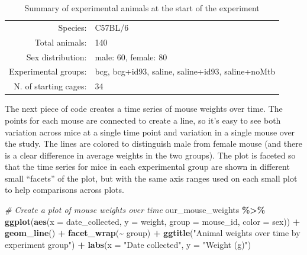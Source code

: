 \documentclass[
]{book}
\newenvironment{Shaded}{\begin{snugshade}}{\end{snugshade}}
\newcommand{\AttributeTok}[1]{\textcolor[rgb]{0.13,0.29,0.53}{#1}}
\newcommand{\CommentTok}[1]{\textcolor[rgb]{0.56,0.35,0.01}{\textit{#1}}}
\newcommand{\FunctionTok}[1]{\textcolor[rgb]{0.13,0.29,0.53}{\textbf{#1}}}
\newcommand{\NormalTok}[1]{#1}
\newcommand{\SpecialCharTok}[1]{\textcolor[rgb]{0.81,0.36,0.00}{\textbf{#1}}}
\newcommand{\StringTok}[1]{\textcolor[rgb]{0.31,0.60,0.02}{#1}}
\begin{document}
\begin{table}

\caption{\label{tab:unnamed-chunk-14}Summary of experimental animals at the start of the experiment}
\centering
\begin{tabular}[t]{r|l}
\hline
 & \\
\hline
Species: & C57BL/6\\
\hline
Total animals: & 140\\
\hline
Sex distribution: & male: 60, female: 80\\
\hline
Experimental groups: & bcg, bcg+id93, saline, saline+id93, saline+noMtb\\
\hline
N. of starting cages: & 34\\
\hline
\end{tabular}
\end{table}

The next piece of code creates a time series of mouse weights over time. The points
for each mouse are connected to create a line, so it's easy to see both variation
across mice at a single time point and variation in a single mouse over the study.
The lines are colored to distinguish male from female mouse (and there is a clear
difference in average weights in the two groups). The plot is faceted so that the
time series for mice in each experimental group are shown in different small
``facets'' of the plot, but with the same axis ranges used on each small plot to
help comparisons across plots.

\begin{Shaded}
\begin{Highlighting}[]
\CommentTok{\# Create a plot of mouse weights over time}
\NormalTok{our\_mouse\_weights }\SpecialCharTok{\%\textgreater{}\%} 
  \FunctionTok{ggplot}\NormalTok{(}\FunctionTok{aes}\NormalTok{(}\AttributeTok{x =}\NormalTok{ date\_collected, }\AttributeTok{y =}\NormalTok{ weight, }
             \AttributeTok{group =}\NormalTok{ mouse\_id, }\AttributeTok{color =}\NormalTok{ sex)) }\SpecialCharTok{+} 
  \FunctionTok{geom\_line}\NormalTok{() }\SpecialCharTok{+} 
  \FunctionTok{facet\_wrap}\NormalTok{(}\SpecialCharTok{\textasciitilde{}}\NormalTok{ group) }\SpecialCharTok{+} 
  \FunctionTok{ggtitle}\NormalTok{(}\StringTok{"Animal weights over time by experiment group"}\NormalTok{) }\SpecialCharTok{+}
  \FunctionTok{labs}\NormalTok{(}\AttributeTok{x =} \StringTok{"Date collected"}\NormalTok{, }
       \AttributeTok{y =} \StringTok{"Weight (g)"}\NormalTok{)}
\end{Highlighting}
\end{Shaded}
\end{document}
